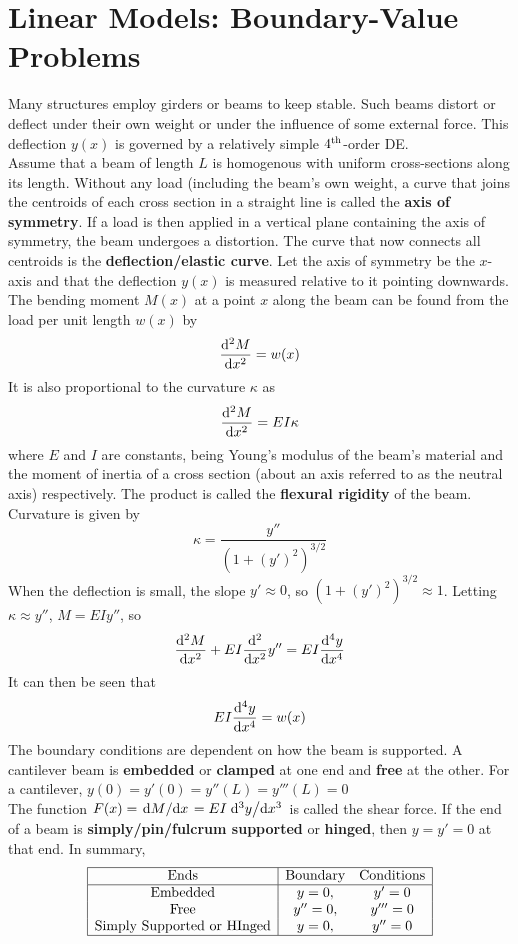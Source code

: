 \documentclass[./Differential Equations.tex]{subfiles}
\begin{document}
	\section{Linear Models: Boundary-Value Problems}
			Many structures employ girders or beams to keep stable. Such beams distort or deflect under their own weight or under the influence of some external force. This deflection \(y(x)\) is governed by a relatively simple \(4^{\text{th}}\)-order DE. \\
			Assume that a beam of length \(L\) is homogenous with uniform cross-sections along its length. Without any load (including the beam's own weight, a curve that joins the centroids of each cross section in a straight line is called the \textbf{axis of symmetry}. If a load is then applied in a vertical plane containing the axis of symmetry, the beam undergoes a distortion. The curve that now connects all centroids is the \textbf{deflection/elastic curve}. Let the axis of symmetry be the \(x\)-axis and that the deflection \(y(x)\) is measured relative to it pointing downwards. The bending moment \(M(x)\) at a point \(x\) along the beam can be found from the load per unit length \(w(x)\) by
				\[\dv[2]{M}{x} = w(x)\]
				It is also proportional to the curvature \(\kappa\) as
				\[\dv[2]{M}{x} = EI\kappa\]
				where \(E\) and \(I\) are constants, being Young's modulus of the beam's material and the moment of inertia of a cross section (about an axis referred to as the neutral axis) respectively. The product is called the \textbf{flexural rigidity} of the beam. \\
				Curvature is given by
				\[\kappa = \frac{y''}{\left(1 + (y')^2\right)^{3/2}}\]
			When the deflection is small, the slope \(y' \approx 0\), so \(\left(1 + (y')^2\right)^{3/2} \approx 1\). Letting \(\kappa \approx y''\), \(M = EIy''\), so
				\[\dv[2]{M}{x} + EI\dv[2]{x}y'' = EI\dv[4]{y}{x}\]
				It can then be seen that 
				\[EI\dv[4]{y}{x} = w(x)\]
				The boundary conditions are dependent on how the beam is supported. A cantilever beam is \textbf{embedded} or \textbf{clamped} at one end and \textbf{free} at the other. For a cantilever, \(y(0) = y'(0) = y''(L) = y'''(L) = 0\) \\
			The function \(F(x) = \dv*{M}{x} = EI\dv*[3]{y}{x}\) is called the shear force. If the end of a beam is \textbf{simply/pin/fulcrum supported} or \textbf{hinged}, then \(y = y' = 0\) at that end. In summary,
				\[\begin{array}{|c|cc|}\hline
					\text{Ends} & \text{Boundary} & \text{Conditions} \\\hline 
					\text{Embedded} & y = 0, & y' = 0 \\
					\text{Free} & y'' = 0, & y''' = 0 \\
					\text{Simply Supported or HInged} &  y = 0, & y'' = 0 \\\hline
				\end{array}\]
\end{document}
